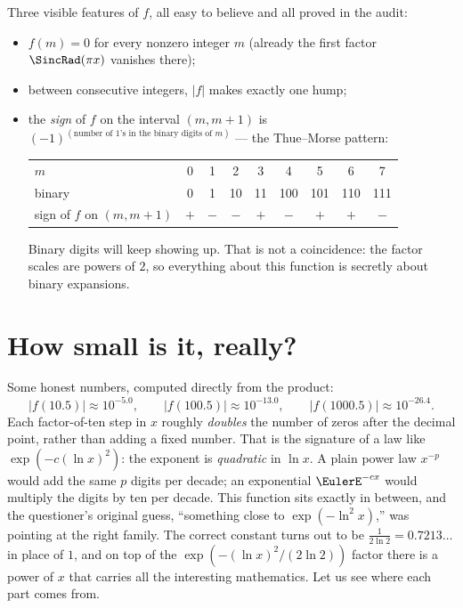 \documentclass[11pt,oneside]{article}
\theoremstyle{remark}
\begin{document}
Three visible features of $f$, all easy to believe and all proved in
the audit:
\begin{itemize}
\item $f(m)=0$ for every nonzero integer $m$ (already the first factor
$\SincRad(\pi x)$ vanishes there);
\item between consecutive integers, $|f|$ makes exactly one hump;
\item the \emph{sign} of $f$ on the interval $(m,m+1)$ is
$(-1)^{(\text{number of 1's in the binary digits of }m)}$ --- the
Thue--Morse pattern:
\begin{center}
\begin{tabular}{@{}l*{8}{c}@{}}
\toprule
$m$ & 0 & 1 & 2 & 3 & 4 & 5 & 6 & 7\\
binary & 0 & 1 & 10 & 11 & 100 & 101 & 110 & 111\\
sign of $f$ on $(m,m+1)$ & $+$ & $-$ & $-$ & $+$ & $-$ & $+$ & $+$ & $-$\\
\bottomrule
\end{tabular}
\end{center}
Binary digits will keep showing up.  That is not a coincidence: the
factor scales are powers of $2$, so everything about this function is
secretly about binary expansions.
\end{itemize}

\section{How small is it, really?}

Some honest numbers, computed directly from the product:
\[
 |f(10.5)|\approx10^{-5.0},\qquad
 |f(100.5)|\approx10^{-13.0},\qquad
 |f(1000.5)|\approx10^{-26.4}.
\]
Each factor-of-ten step in $x$ roughly \emph{doubles} the number of
zeros after the decimal point, rather than adding a fixed number.
That is the signature of a law like
$\exp(-c(\ln x)^2)$: the exponent is \emph{quadratic} in $\ln x$.  A
plain power law $x^{-p}$ would add the same $p$ digits per decade;
an exponential $\EulerE^{-cx}$ would multiply the digits by ten per decade.
This function sits exactly in between, and the questioner's original
guess, ``something close to $\exp(-\ln^2x)$,'' was pointing at the
right family.  The correct constant turns out to be
$\frac{1}{2\ln2}=0.7213\ldots$ in place of $1$, and on top of the
$\exp(-(\ln x)^2/(2\ln2))$ factor there is a power of $x$ that carries
all the interesting mathematics.  Let us see where each part comes
from.
\end{document}

